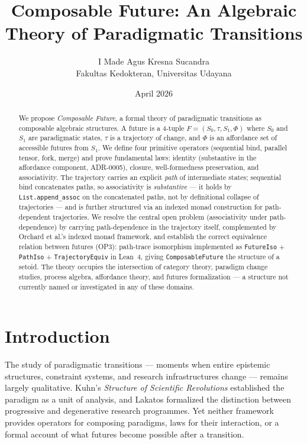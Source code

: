 \documentclass[11pt,a4paper]{article}
\title{Composable Future: An Algebraic Theory of Paradigmatic Transitions}
\author{I Made Agus Kresna Sucandra\\
Fakultas Kedokteran, Universitas Udayana}
\date{April 2026}
\begin{document}
\maketitle

\begin{abstract}
We propose \emph{Composable Future}, a formal theory of paradigmatic transitions as composable algebraic structures. A future is a 4-tuple $F = (S_0, \tau, S_1, \Phi)$ where $S_0$ and $S_1$ are paradigmatic states, $\tau$ is a trajectory of change, and $\Phi$ is an affordance set of accessible futures from $S_1$. We define four primitive operators (sequential bind, parallel tensor, fork, merge) and prove fundamental laws: identity (substantive in the affordance component, ADR-0005), closure, well-formedness preservation, and associativity. The trajectory carries an explicit \emph{path} of intermediate states; sequential bind concatenates paths, so associativity is \emph{substantive} --- it holds by \texttt{List.append\_assoc} on the concatenated paths, not by definitional collapse of trajectories --- and is further structured via an indexed monad construction for path-dependent trajectories. We resolve the central open problem (associativity under path-dependence) by carrying path-dependence in the trajectory itself, complemented by Orchard et al.'s indexed monad framework, and establish the correct equivalence relation between futures (OP3): path-trace isomorphism implemented as \texttt{FutureIso} + \texttt{PathIso} + \texttt{TrajectoryEquiv} in Lean~4, giving \texttt{ComposableFuture} the structure of a setoid. The theory occupies the intersection of category theory, paradigm change studies, process algebra, affordance theory, and futures formalization — a structure not currently named or investigated in any of these domains.
\end{abstract}

\section{Introduction}

The study of paradigmatic transitions — moments when entire epistemic structures, constraint systems, and research infrastructures change — remains largely qualitative. Kuhn's \emph{Structure of Scientific Revolutions} \cite{kuhn1962} established the paradigm as a unit of analysis, and Lakatos \cite{lakatos1978} formalized the distinction between progressive and degenerative research programmes. Yet neither framework provides operators for composing paradigms, laws for their interaction, or a formal account of what futures become possible after a transition.
\end{document}
